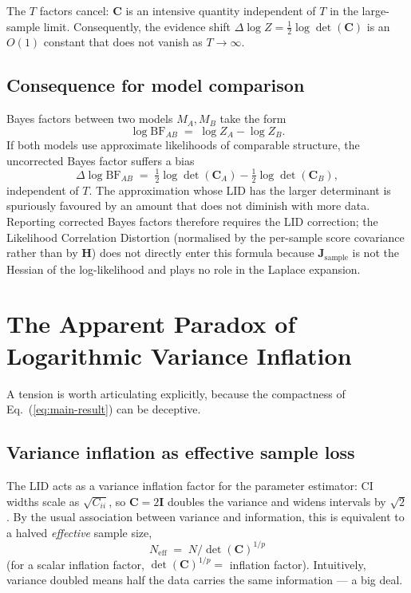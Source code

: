 \documentclass[11pt]{article}
\begin{document}
The $T$ factors cancel: $\mathbf C$ is an intensive quantity independent of $T$ in the large-sample limit. Consequently, the evidence shift $\Delta\log Z = \tfrac{1}{2}\log\det(\mathbf C)$ is an $O(1)$ constant that does not vanish as $T\to\infty$.

\subsection{Consequence for model comparison}

Bayes factors between two models $M_A, M_B$ take the form
\begin{equation}
\log\mathrm{BF}_{AB}
\;=\;
\log Z_A - \log Z_B.
\end{equation}
If both models use approximate likelihoods of comparable structure, the uncorrected Bayes factor suffers a bias
\begin{equation}
\Delta \log\mathrm{BF}_{AB}
\;=\;
\tfrac{1}{2}\log\det(\mathbf C_A)
-
\tfrac{1}{2}\log\det(\mathbf C_B),
\end{equation}
independent of $T$. The approximation whose LID has the larger determinant is spuriously favoured by an amount that does not diminish with more data. Reporting corrected Bayes factors therefore requires the LID correction; the Likelihood Correlation Distortion (normalised by the per-sample score covariance rather than by $\mathbf H$) does not directly enter this formula because $\mathbf J_{\mathrm{sample}}$ is not the Hessian of the log-likelihood and plays no role in the Laplace expansion.

\section{The Apparent Paradox of Logarithmic Variance Inflation}
\label{sec:apparent-paradox}

A tension is worth articulating explicitly, because the compactness of Eq.~(\ref{eq:main-result}) can be deceptive.

\subsection{Variance inflation as effective sample loss}

The LID acts as a variance inflation factor for the parameter estimator: CI widths scale as $\sqrt{C_{ii}}$, so $\mathbf C = 2\mathbf I$ doubles the variance and widens intervals by $\sqrt{2}$. By the usual association between variance and information, this is equivalent to a halved \emph{effective} sample size,
\begin{equation}
N_{\mathrm{eff}} \;=\; N / \det(\mathbf C)^{1/p}
\end{equation}
(for a scalar inflation factor, $\det(\mathbf C)^{1/p} = $ inflation factor). Intuitively, variance doubled means half the data carries the same information --- a big deal.
\end{document}

